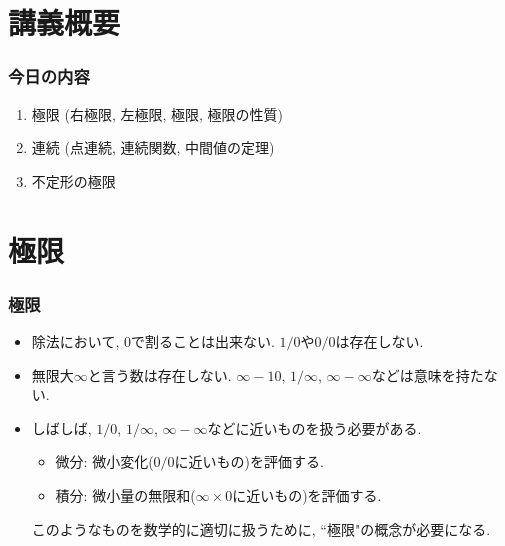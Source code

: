 

\section{講義概要}


\begin{frame}
\frametitle{今日の内容}



\begin{enumerate}
\item 極限 (右極限, 左極限, 極限, 極限の性質)
\item 連続 (点連続, 連続関数, 中間値の定理)
\item 不定形の極限
\end{enumerate} 



\end{frame}







\section{極限}

\begin{frame}
\frametitle{極限}



\begin{itemize}
\item 除法において, $0$で割ることは出来ない. $1/0$や$0/0$は存在しない. 
\item 無限大$\infty$と言う数は存在しない. $\infty-10$, $1/\infty$, $\infty - \infty$などは意味を持たない. 
\item しばしば, $1/0$, $1/\infty$, $\infty - \infty$などに近いものを扱う必要がある.
\begin{itemize}
\item 微分: 微小変化($0/0$に近いもの)を評価する. 
\item 積分: 微小量の無限和($\infty \times 0$に近いもの)を評価する. 
\end{itemize}
このようなものを数学的に適切に扱うために, ``極限"の概念が必要になる. 
\end{itemize}

\end{frame}





